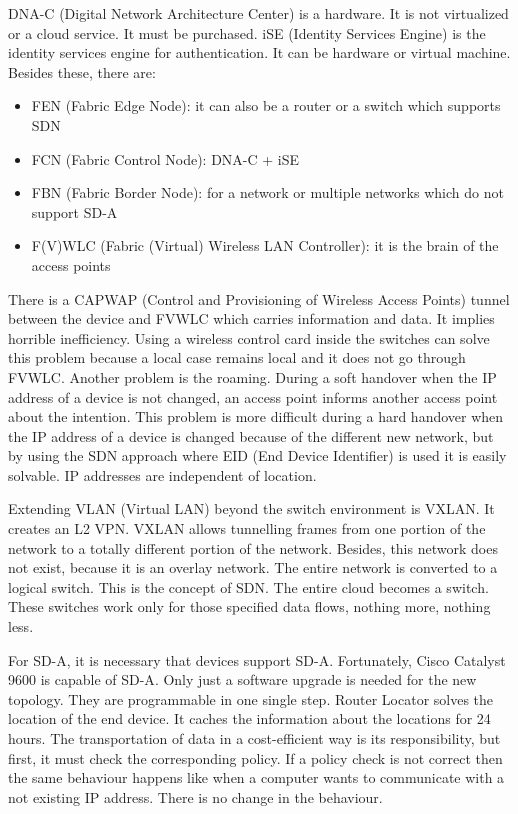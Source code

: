 \documentclass{article}
\begin{document}
DNA-C (Digital Network Architecture Center) is a hardware. It is not virtualized or a cloud service. It must be purchased. iSE (Identity Services Engine) is the identity services engine for authentication. It can be hardware or virtual machine. Besides these, there are:
\begin{itemize}
    \item FEN (Fabric Edge Node): it can also be a router or a switch which supports SDN
    \item FCN (Fabric Control Node): DNA-C + iSE
    \item FBN (Fabric Border Node): for a network or multiple networks which do not support SD-A
    \item F(V)WLC (Fabric (Virtual) Wireless LAN Controller): it is the brain of the access points
\end{itemize}

There is a CAPWAP (Control and Provisioning of Wireless Access Points) tunnel between the device and FVWLC which carries information and data. It implies horrible inefficiency. Using a wireless control card inside the switches can solve this problem because a local case remains local and it does not go through FVWLC. Another problem is the roaming. During a soft handover when the IP address of a device is not changed, an access point informs another access point about the intention. This problem is more difficult during a hard handover when the IP address of a device is changed because of the different new network, but by using the SDN approach where EID (End Device Identifier) is used it is easily solvable. IP addresses are independent of location.

Extending VLAN (Virtual LAN) beyond the switch environment is VXLAN. It creates an L2 VPN. VXLAN allows tunnelling frames from one portion of the network to a totally different portion of the network. Besides, this network does not exist, because it is an overlay network. The entire network is converted to a logical switch. This is the concept of SDN. The entire cloud becomes a switch. These switches work only for those specified data flows, nothing more, nothing less.

For SD-A, it is necessary that devices support SD-A. Fortunately, Cisco Catalyst 9600 is capable of SD-A\cite{Cat9600_sda}. Only just a software upgrade is needed for the new topology. They are programmable in one single step. Router Locator solves the location of the end device. It caches the information about the locations for 24 hours. The transportation of data in a cost-efficient way is its responsibility, but first, it must check the corresponding policy. If a policy check is not correct then the same behaviour happens like when a computer wants to communicate with a not existing IP address.  There is no change in the behaviour.
\end{document}
